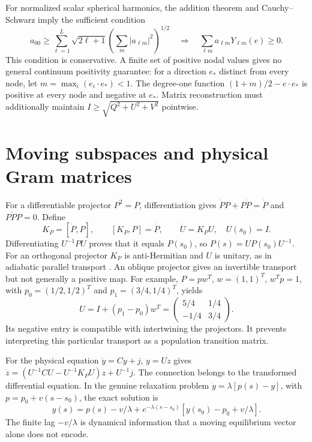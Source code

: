 For normalized scalar spherical harmonics, the addition theorem and Cauchy--Schwarz imply the sufficient condition
\begin{equation}
 a_{00}\ge\sum_{\ell=1}^{L}\sqrt{2\ell+1}
 \left(\sum_m|a_{\ell m}|^2\right)^{1/2}
 \quad\Longrightarrow\quad
 \sum_{\ell m}a_{\ell m}Y_{\ell m}(e)\ge0 .
 \label{v:harmonic_positivity}
\end{equation}
This condition is conservative. A finite set of positive nodal values gives no general continuum positivity guarantee: for a direction $e_*$ distinct from every node, let $m=\max_i(e_i\cdot e_*)<1$. The degree-one function $(1+m)/2-e\cdot e_*$ is positive at every node and negative at $e_*$. Matrix reconstruction must additionally maintain $I\ge\sqrt{Q^2+U^2+V^2}$ pointwise.

\section{Moving subspaces and physical Gram matrices}
\label{v:moving_spaces}

For a differentiable projector $P^2=P$, differentiation gives
$\dot P P+P\dot P=\dot P$ and $P\dot P P=0$. Define
\begin{equation}
 K_P=[\dot P,P],\qquad [K_P,P]=\dot P,\qquad
 \dot U=K_PU,\quad U(s_0)=I .
 \label{v:kato}
\end{equation}
Differentiating $U^{-1}PU$ proves that it equals $P(s_0)$, so $P(s)=UP(s_0)U^{-1}$. For an orthogonal projector $K_P$ is anti-Hermitian and $U$ is unitary, as in adiabatic parallel transport \cite{vKato1950}. An oblique projector gives an invertible transport but not generally a positive map. For example, $P=pw^T$, $w=(1,1)^T$, $w^Tp=1$, with $p_0=(1/2,1/2)^T$ and $p_1=(3/4,1/4)^T$, yields
\begin{equation}
 U=I+(p_1-p_0)w^T=
 \begin{pmatrix}5/4&1/4\\-1/4&3/4\end{pmatrix}.
 \label{v:oblique_example}
\end{equation}
Its negative entry is compatible with intertwining the projectors. It prevents interpreting this particular transport as a population transition matrix.

For the physical equation $\dot y=Cy+j$, $y=Uz$ gives
$\dot z=(U^{-1}CU-U^{-1}K_PU)z+U^{-1}j$. The connection belongs to the transformed differential equation. In the genuine relaxation problem $\dot y=\lambda[p(s)-y]$, with $p=p_0+v(s-s_0)$, the exact solution is
\begin{equation}
 y(s)=p(s)-v/\lambda+
 e^{-\lambda(s-s_0)}[y(s_0)-p_0+v/\lambda] .
 \label{v:relaxation_lag}
\end{equation}
The finite lag $-v/\lambda$ is dynamical information that a moving equilibrium vector alone does not encode.

